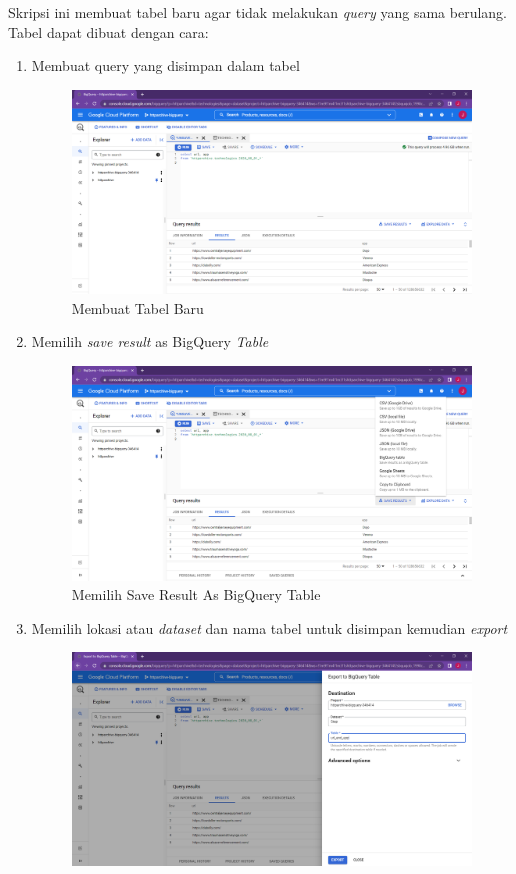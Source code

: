 Skripsi ini membuat tabel baru agar tidak melakukan \textit{query} yang sama berulang. Tabel dapat dibuat dengan cara:
\begin{enumerate}
	\item Membuat query yang disimpan dalam tabel
	\begin{figure}[H]
	\centering  
	\includegraphics[scale=0.35]{Gambar/membuat query.PNG}  
	\caption{Membuat Tabel Baru} 
	\label{fig:create_table} 
\end{figure}
	\item Memilih \textit{save result} as BigQuery \textit{Table}
	\begin{figure}[H]
		\centering  
		\includegraphics[scale=0.35]{Gambar/save bigquery table.PNG}  
		\caption{Memilih Save Result As BigQuery Table} 
		\label{fig:save_table}
	\end{figure}
	\item Memilih lokasi atau \textit{dataset} dan nama tabel untuk disimpan kemudian \textit{export}
	\begin{figure}[H]
		\centering  
		\includegraphics[scale=0.35]{Gambar/export table.PNG}  

\end{figure}
\end{enumerate}
